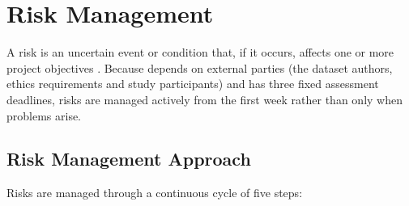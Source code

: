 \section{Risk Management}\label{sec:risk}

\newcommand{\rlow}[1]{\cellcolor{risklow}Low (#1)}
\newcommand{\rmed}[1]{\cellcolor{riskmed}Medium (#1)}
\newcommand{\rhigh}[1]{\cellcolor{riskhigh}High (#1)}
\newcommand{\rcrit}[1]{\cellcolor{riskcrit}Critical (#1)}

A risk is an uncertain event or condition that, if it occurs, affects one or more project objectives \parencite{pmi2021pmbok}. Because \projectname{} depends on external parties (the dataset authors, ethics requirements and study participants) and has three fixed assessment deadlines, risks are managed actively from the first week rather than only when problems arise.

\subsection{Risk Management Approach}\label{sec:risk-approach}

Risks are managed through a continuous cycle of five steps:

